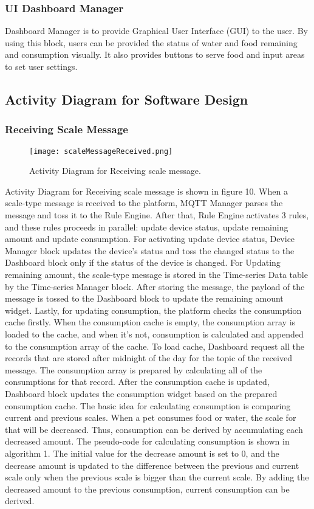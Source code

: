 \documentclass[conference]{IEEEtran}
\begin{document}
\subsubsection{UI Dashboard Manager}
\hfill \break Dashboard Manager is to provide Graphical User Interface (GUI) to the user. By using this block, users can be provided the status of water and food remaining and consumption visually. It also provides buttons to serve food and input areas to set user settings.

\subsection{Activity Diagram for Software Design}
\subsubsection{Receiving Scale Message}
\begin{figure}[htbp]
\centerline{\texttt{[image: scaleMessageReceived.png]}}
\caption{Activity Diagram for Receiving scale message.}
\label{fig}
\end{figure}

Activity Diagram for Receiving scale message is shown in figure 10. When a scale-type message is received to the platform, MQTT Manager parses the message and toss it to the Rule Engine. After that, Rule Engine activates 3 rules, and these rules proceeds in parallel: update device status, update remaining amount and update consumption. For activating update device status, Device Manager block updates the device’s status and toss the changed status to the Dashboard block only if the status of the device is changed. For Updating remaining amount, the scale-type message is stored in the Time-series Data table by the Time-series Manager block. After storing the message, the payload of the message is tossed to the Dashboard block to update the remaining amount widget.
Lastly, for updating consumption, the platform checks the consumption cache firstly. When the consumption cache is empty, the consumption array is loaded to the cache, and when it’s not, consumption is calculated and appended to the consumption array of the cache. To load cache, Dashboard request all the records that are stored after midnight of the day for the topic of the received message. The consumption array is prepared by calculating all of the consumptions for that record. After the consumption cache is updated, Dashboard block updates the consumption widget based on the prepared consumption cache.
The basic idea for calculating consumption is comparing current and previous scales. When a pet consumes food or water, the scale for that will be decreased. Thus, consumption can be derived by accumulating each decreased amount. The pseudo-code for calculating consumption is shown in algorithm 1. The initial value for the decrease amount is set to 0, and the decrease amount is updated to the difference between the previous and current scale only when the previous scale is bigger than the current scale. By adding the decreased amount to the previous consumption, current consumption can be derived.
\end{document}
